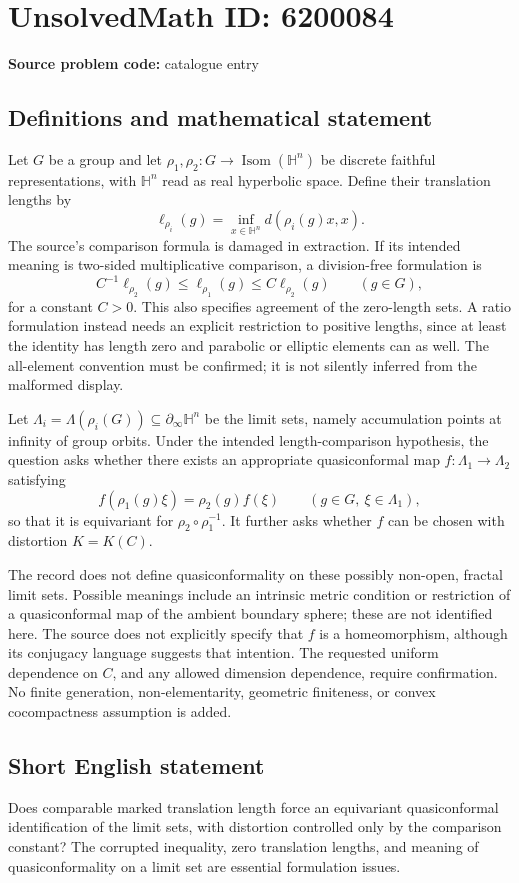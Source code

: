 \documentclass[11pt]{article}
\begin{document}
\section*{UnsolvedMath ID: 6200084}
\textbf{Source problem code:} catalogue entry
\subsection{Definitions and mathematical statement}
Let $G$ be a group and let $\rho_1,\rho_2:G\to\operatorname{Isom}(\mathbb H^n)$ be discrete faithful representations, with $\mathbb H^n$ read as real hyperbolic space. Define their translation lengths by
\[
 \ell_{\rho_i}(g)=\inf_{x\in\mathbb H^n}d(\rho_i(g)x,x).
\]
The source's comparison formula is damaged in extraction. If its intended meaning is two-sided multiplicative comparison, a division-free formulation is
\[
 C^{-1}\ell_{\rho_2}(g)\le\ell_{\rho_1}(g)
       \le C\ell_{\rho_2}(g)\qquad(g\in G),
\]
for a constant $C>0$. This also specifies agreement of the zero-length sets. A ratio formulation instead needs an explicit restriction to positive lengths, since at least the identity has length zero and parabolic or elliptic elements can as well. The all-element convention must be confirmed; it is not silently inferred from the malformed display.

Let $\Lambda_i=\Lambda(\rho_i(G))\subseteq\partial_\infty\mathbb H^n$ be the limit sets, namely accumulation points at infinity of group orbits. Under the intended length-comparison hypothesis, the question asks whether there exists an appropriate quasiconformal map $f:\Lambda_1\to\Lambda_2$ satisfying
\[
 f(\rho_1(g)\xi)=\rho_2(g)f(\xi)
 \qquad(g\in G,\ \xi\in\Lambda_1),
\]
so that it is equivariant for $\rho_2\circ\rho_1^{-1}$. It further asks whether $f$ can be chosen with distortion $K=K(C)$.

The record does not define quasiconformality on these possibly non-open, fractal limit sets. Possible meanings include an intrinsic metric condition or restriction of a quasiconformal map of the ambient boundary sphere; these are not identified here. The source does not explicitly specify that $f$ is a homeomorphism, although its conjugacy language suggests that intention. The requested uniform dependence on $C$, and any allowed dimension dependence, require confirmation. No finite generation, non-elementarity, geometric finiteness, or convex cocompactness assumption is added.
\subsection{Short English statement}
Does comparable marked translation length force an equivariant quasiconformal identification of the limit sets, with distortion controlled only by the comparison constant? The corrupted inequality, zero translation lengths, and meaning of quasiconformality on a limit set are essential formulation issues.
\end{document}
